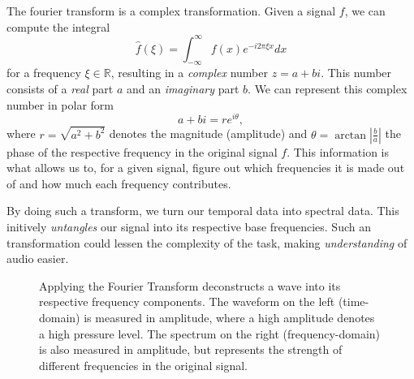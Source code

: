 The fourier transform is a complex transformation. Given a signal $f$, we can compute the integral \[ \widehat{f}(\xi) = \int^{\infty}_{-\infty}{f(x)e^{-i2\pi \xi x} dx} \] for a frequency $\xi \in \mathbb{R}$, resulting in a \textit{complex} number $z = a + bi$. This number consists of a \textit{real} part $a$ and an \textit{imaginary} part $b$. We can represent this complex number in polar form \[ a + bi = re^{i\theta}, \] where $r = \sqrt{a^2 + b^2}$ denotes the magnitude (amplitude) and $\theta = \arctan{|\frac{b}{a}|}$ the phase of the respective frequency in the original signal $f$. This information is what allows us to, for a given signal, figure out which frequencies it is made out of and how much each frequency contributes. 

By doing such a transform, we turn our temporal data into spectral data. This initively \textit{untangles} our signal into its respective base frequencies. Such an transformation could lessen the complexity of the task, making \textit{understanding} of audio easier.

\begin{figure}[H]
    \centering
    \hspace*{-1.3cm}
    \caption{Applying the Fourier Transform deconstructs a wave into its respective frequency components. The waveform on the left (time-domain) is measured in amplitude, where a high amplitude denotes a high pressure level. The spectrum on the right (frequency-domain) is also measured in amplitude, but represents the strength of different frequencies in the original signal.}
    \label{FTFigure}
\end{figure}

